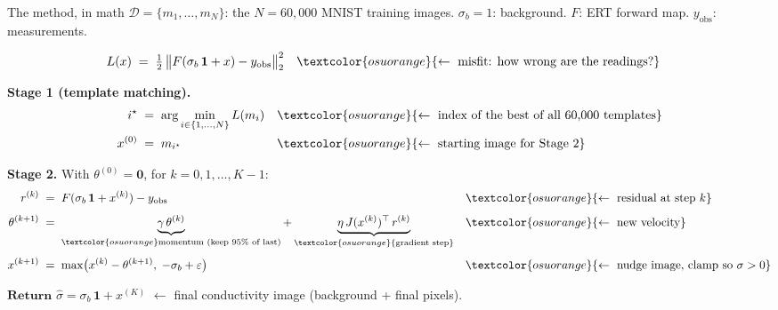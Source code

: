 \documentclass[aspectratio=169,11pt]{beamer}
\begin{document}
\begin{frame}{The method, in math}
\footnotesize
$\mathcal{D} = \{m_1, \ldots, m_N\}$: the $N = 60{,}000$ MNIST training images.
$\sigma_b = 1$: background. $F$: ERT forward map. $y_{\text{obs}}$: measurements.

\smallskip
\begin{align*}
L(x) \;&=\; \tfrac{1}{2}\, \bigl\| F(\sigma_b\,\mathbf{1} + x) - y_{\text{obs}} \bigr\|_2^2
       & &\textcolor{osuorange}{\leftarrow\ \text{misfit: how wrong are the readings?}}
\end{align*}

\textbf{Stage 1 (template matching).}
\begin{align*}
i^{\star} \;&=\; \arg\min_{i \in \{1, \ldots, N\}} L(m_i)
       & &\textcolor{osuorange}{\leftarrow\ \text{index of the best of all 60{,}000 templates}} \\
x^{(0)} \;&=\; m_{i^{\star}}
       & &\textcolor{osuorange}{\leftarrow\ \text{starting image for Stage 2}}
\end{align*}

\textbf{Stage 2.} With $\theta^{(0)} = \mathbf{0}$, for $k = 0, 1, \ldots, K-1$:
\begin{align*}
r^{(k)} \;&=\; F(\sigma_b\,\mathbf{1} + x^{(k)}) - y_{\text{obs}}
       & &\textcolor{osuorange}{\leftarrow\ \text{residual at step } k} \\[0.4em]
\theta^{(k+1)} \;&=\; \underbrace{\gamma\,\theta^{(k)}}_{\textcolor{osuorange}{\text{momentum (keep 95\% of last)}}}
                    + \underbrace{\eta\, J(x^{(k)})^{\top}\, r^{(k)}}_{\textcolor{osuorange}{\text{gradient step}}}
       & &\textcolor{osuorange}{\leftarrow\ \text{new velocity}} \\[0.4em]
x^{(k+1)} \;&=\; \max\bigl(x^{(k)} - \theta^{(k+1)},\; -\sigma_b + \varepsilon\bigr)
       & &\textcolor{osuorange}{\leftarrow\ \text{nudge image, clamp so } \sigma > 0}
\end{align*}

\smallskip
$\textbf{Return } \hat{\sigma} = \sigma_b\,\mathbf{1} + x^{(K)}$
\hspace{0.6em}\textcolor{osuorange}{$\leftarrow$ final conductivity image (background + final pixels).}
\end{frame}
\end{document}
